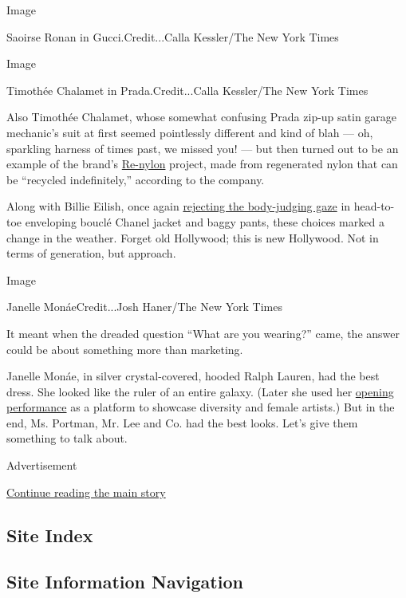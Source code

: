 Image

Saoirse Ronan in Gucci.Credit...Calla Kessler/The New York Times

Image

Timothée Chalamet in Prada.Credit...Calla Kessler/The New York Times

Also Timothée Chalamet, whose somewhat confusing Prada zip-up satin
garage mechanic's suit at first seemed pointlessly different and kind of
blah --- oh, sparkling harness of times past, we missed you! --- but
then turned out to be an example of the brand's
\href{https://www.pradagroup.com/en/sustainability/environment-csr/prada-re-nylon.html}{Re-nylon}
project, made from regenerated nylon that can be ``recycled
indefinitely,'' according to the company.

Along with Billie Eilish, once again
\href{https://www.nytimes.com/2020/01/27/fashion/billie-eilish-grammys.html}{rejecting
the body-judging gaze} in head-to-toe enveloping bouclé Chanel jacket
and baggy pants, these choices marked a change in the weather. Forget
old Hollywood; this is new Hollywood. Not in terms of generation, but
approach.

Image

Janelle MonáeCredit...Josh Haner/The New York Times

It meant when the dreaded question ``What are you wearing?'' came, the
answer could be about something more than marketing.

Janelle Monáe, in silver crystal-covered, hooded Ralph Lauren, had the
best dress. She looked like the ruler of an entire galaxy. (Later she
used her
\href{https://www.nytimes.com/2020/02/09/movies/oscars-opening-act-janelle-monae.html}{opening
performance} as a platform to showcase diversity and female artists.)
But in the end, Ms. Portman, Mr. Lee and Co. had the best looks. Let's
give them something to talk about.

Advertisement

\protect\hyperlink{after-bottom}{Continue reading the main story}

\hypertarget{site-index}{%
\subsection{Site Index}\label{site-index}}

\hypertarget{site-information-navigation}{%
\subsection{Site Information
Navigation}\label{site-information-navigation}}

